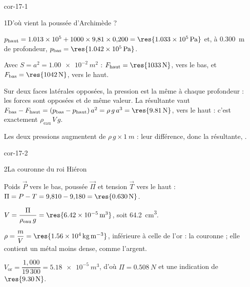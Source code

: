 \corrigesSouples

\begin{blocLivre}{cor-17-1}
\begin{corrige}{1}{D'où vient la poussée d'Archimède ?}
\begin{questions}
\item $p_\mathrm{haut}=\num{1.013e5}+1000\times9{,}81\times0{,}200=\res{\qty{1,033e5}{Pa}}$ et, à \qty{0,300}{m} de profondeur,
$p_\mathrm{bas}=\res{\qty{1,042e5}{Pa}}$.
\item Avec $S=a^2=\qty{1,00e-2}{m^2}$ : $F_\mathrm{haut}=\res{\qty{1033}{N}}$, vers le bas, et $F_\mathrm{bas}=\res{\qty{1042}{N}}$, vers le
haut.
\item Sur deux faces latérales opposées, la pression est la même à chaque profondeur : les forces sont opposées et de
même valeur. La résultante vaut $F_\mathrm{bas}-F_\mathrm{haut}=(p_\mathrm{bas}-p_\mathrm{haut})\,a^2=\rho\,g\,a^3=\res{\qty{9,81}{N}}$,
vers le haut : c'est exactement $\rho_\mathrm{eau}\,V\,g$.
\item Les deux pressions augmentent de $\rho\,g\times\qty{1}{m}$ : leur différence, donc la résultante, .
\end{questions}
\end{corrige}
\end{blocLivre}
\begin{blocLivre}{cor-17-2}
\begin{corrige}{2}{La couronne du roi Hiéron}
\begin{questions}
\item Poids $\vec{P}$ vers le bas, poussée $\vec{\Pi}$ et tension $\vec{T}$ vers le haut : $\Pi=P-T=9{,}810-9{,}180=\res{\qty{0,630}{N}}$.
\item $V=\dfrac{\Pi}{\rho_\mathrm{eau}\,g}=\res{\qty{6,42e-5}{m^3}}$, soit \qty{64,2}{cm^3}.
\item $\rho=\dfrac{m}{V}=\res{\qty{1,56e4}{kg.m^{-3}}}$, inférieure à celle de l'or : la couronne  ;
elle contient un métal moins dense, comme l'argent.
\item $V_\mathrm{or}=\dfrac{1{,}000}{19\,300}=\qty{5,18e-5}{m^3}$, d'où $\Pi=\qty{0,508}{N}$ et une indication de
$\res{\qty{9,30}{N}}$.
\end{questions}
\end{corrige}
\end{blocLivre}
